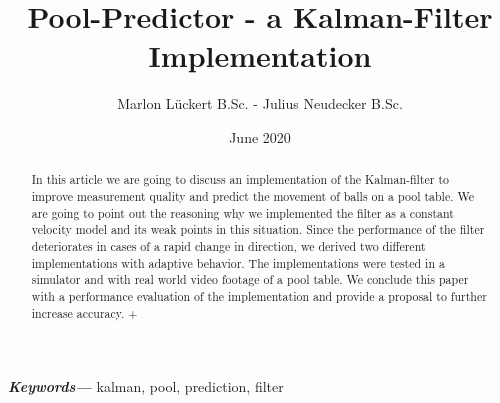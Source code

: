 \documentclass[notitlepage, a4paper, 11pt]{scrartcl}
\providecommand{\keywords}[1]
{
  \small	
  \textbf{\textit{Keywords---}} #1
}
\begin{document}
\title{Pool-Predictor - a Kalman-Filter Implementation}
\author{Marlon Lückert B.Sc. - Julius Neudecker B.Sc.}
\date{June 2020}

\maketitle

\begin{abstract}
In this article we are going to discuss an implementation of the Kalman-filter \cite{kalman} to improve measurement quality and predict the movement of balls on a pool table. 
We are going to point out the reasoning why we implemented the filter as a constant velocity model and its weak points in this situation.
Since the performance of the filter deteriorates in cases of a rapid change in direction, we derived two different implementations with adaptive behavior.
The implementations were tested in a simulator and with real world video footage of a pool table.
We conclude this paper with a performance evaluation of the implementation and provide a proposal to further increase accuracy.
+
\end{abstract}

\keywords{kalman, pool, prediction, filter}
\end{document}

